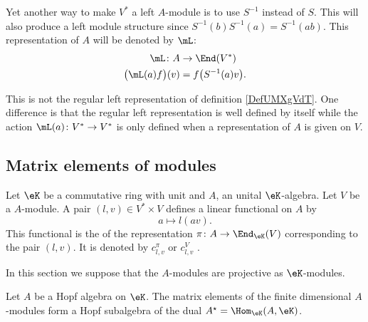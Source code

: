 Yet another way to make \( V^*\) a left \( A\)-module is to use \( S^{-1}\) instead of \( S\). This will also produce a left module structure since \( S^{-1}(b)S^{-1}(a)=S^{-1}(ab)\). This representation of \( A\) will be denoted by \( \mL\):
\begin{equation}        \label{EqDefTroisleftmodAstar}
    \begin{aligned}
        \mL\colon A&\to \End(V^*) \\
        \big( \mL(a)f \big)(v)&=f\big( S^{-1}(a)v \big). 
    \end{aligned}
\end{equation}

\begin{remark}
    This is not the regular left representation of definition \ref{DefUMXgVdT}. One difference is that the regular left representation is well defined by itself while the action \( \mL(a)\colon V^*\to V^*\) is only defined when a representation of \( A\) is given on \( V\).    
\end{remark}

\subsection{Matrix elements of modules}

Let \( \eK\) be a commutative ring with unit and \( A\), an unital \( \eK\)-algebra. Let \( V\) be a \( A\)-module. A pair \( (l,v)\in V^*\times V\) defines a linear functional on \( A\) by
\begin{equation}
    a\mapsto l(av).
\end{equation}
This functional is the  of the representation \( \pi\colon A\to \End_{\eK}(V)\) corresponding to the pair \( (l,v)\). It is denoted by \( c^{\pi}_{l,v}\) or \( c^V_{l,v}\)  .

In this section we suppose that the \( A\)-modules are projective as \( \eK\)-modules.

\begin{proposition}     \label{PropHopfDual}
    Let \( A\) be a Hopf algebra on \( \eK\). The matrix elements of the finite dimensional \( A\)-modules form a Hopf subalgebra of the dual \( A^{\star}=\Hom_{\eK}(A,\eK)\).
\end{proposition}

